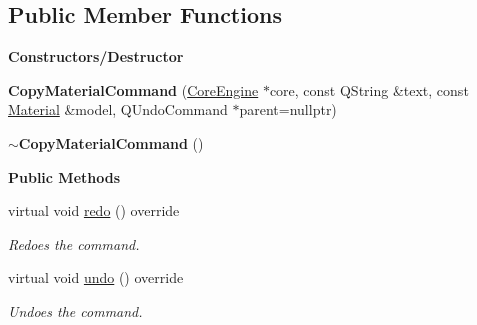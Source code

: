 \subsection*{Public Member Functions}
\begin{Indent}\textbf{ Constructors/\+Destructor}\par
\begin{DoxyCompactItemize}
\item 
\mbox{\label{classrev_1_1_copy_material_command_a3505b8301d06dae7a60bcd7249f8543d}} 
{\bfseries Copy\+Material\+Command} (\mbox{\hyperlink{classrev_1_1_core_engine}{Core\+Engine}} $\ast$core, const Q\+String \&text, const \mbox{\hyperlink{classrev_1_1_material}{Material}} \&model, Q\+Undo\+Command $\ast$parent=nullptr)
\item 
\mbox{\label{classrev_1_1_copy_material_command_a3508eda7e77be41b82f6a296ce34fac9}} 
{\bfseries $\sim$\+Copy\+Material\+Command} ()
\end{DoxyCompactItemize}
\end{Indent}
\begin{Indent}\textbf{ Public Methods}\par
\begin{DoxyCompactItemize}
\item 
\mbox{\label{classrev_1_1_copy_material_command_ae6be5b88db300dde50d01348e1c01ddf}} 
virtual void \mbox{\hyperlink{classrev_1_1_copy_material_command_ae6be5b88db300dde50d01348e1c01ddf}{redo}} () override
\begin{DoxyCompactList}\small\item\em Redoes the command. \end{DoxyCompactList}\item 
\mbox{\label{classrev_1_1_copy_material_command_a2a5408a4b18ebdeee07dd839bb00a466}} 
virtual void \mbox{\hyperlink{classrev_1_1_copy_material_command_a2a5408a4b18ebdeee07dd839bb00a466}{undo}} () override
\begin{DoxyCompactList}\small\item\em Undoes the command. \end{DoxyCompactList}\end{DoxyCompactItemize}
\end{Indent}
